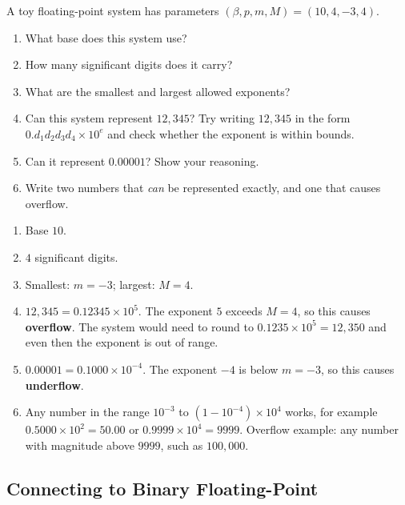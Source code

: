 \begin{Exercise}[title={Reading the parameters}, label={ex:fp-parameter}]
  A toy floating-point system has parameters $(\beta, p, m, M) = (10, 4, -3, 4)$.
  \begin{enumerate}
    \item What base does this system use?
    \item How many significant digits does it carry?
    \item What are the smallest and largest allowed exponents?
    \item Can this system represent $12{,}345$?
          Try writing $12{,}345$ in the form $0.d_1d_2d_3d_4 \times 10^e$ and
          check whether the exponent is within bounds.
    \item Can it represent $0.00001$?
          Show your reasoning.
    \item Write two numbers that \emph{can} be represented exactly, and one
          that causes overflow.
  \end{enumerate}
\end{Exercise}
\begin{Answer}[ref={ex:fp-parameter}]
  \begin{enumerate}
    \item Base $10$.
    \item $4$ significant digits.
    \item Smallest: $m = -3$;\; largest: $M = 4$.
    \item $12{,}345 = 0.12345 \times 10^5$.
          The exponent $5$ exceeds $M = 4$, so this causes \textbf{overflow}.
          The system would need to round to $0.1235 \times 10^5 = 12{,}350$
          and even then the exponent is out of range.
    \item $0.00001 = 0.1000 \times 10^{-4}$.
          The exponent $-4$ is below $m = -3$, so this causes
          \textbf{underflow}.
    \item Any number in the range $10^{-3}$ to $(1-10^{-4}) \times 10^4$
          works, for example $0.5000 \times 10^2 = 50.00$ or
          $0.9999 \times 10^{4} = 9999$.
          Overflow example: any number with magnitude above $9999$, such
          as $100{,}000$.
  \end{enumerate}
\end{Answer}

\subsection{Connecting to Binary Floating-Point}

